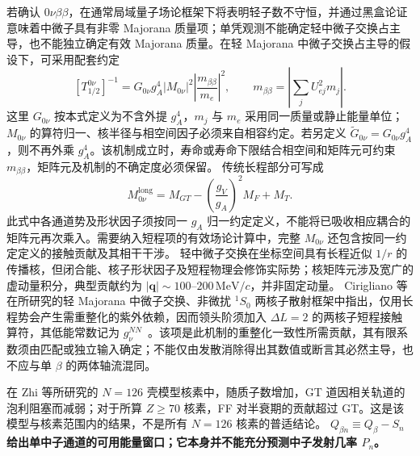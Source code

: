 若确认 $0\nu\beta\beta$，在通常局域量子场论框架下将表明轻子数不守恒，并通过黑盒论证意味着中微子具有非零 Majorana 质量项；单凭观测不能确定轻中微子交换占主导，也不能独立确定有效 Majorana 质量。在轻 Majorana 中微子交换占主导的假设下，可采用配套约定
\begin{equation}\label{eq:4-7-0nubb-halflife}
[T_{1/2}^{0\nu}]^{-1}=G_{0\nu}g_A^4|M_{0\nu}|^2\left|\frac{m_{\beta\beta}}{m_e}\right|^2,\qquad m_{\beta\beta}=\left|\sum_jU_{ej}^2m_j\right|.
\end{equation}
这里 $G_{0\nu}$ 按本式定义为不含外提 $g_A^4$，$m_j$ 与 $m_e$ 采用同一质量或静止能量单位；$M_{0\nu}$ 的算符归一、核半径与相空间因子必须来自相容约定。若另定义 $\widetilde G_{0\nu}=G_{0\nu}g_A^4$，则不再外乘 $g_A^4$。该机制成立时，寿命或寿命下限结合相空间和矩阵元可约束 $m_{\beta\beta}$，矩阵元及机制的不确定度必须保留。
传统长程部分可写成
\begin{equation}\label{eq:4-7-NME-decomposition}
M_{0\nu}^{\mathrm{long}}=M_{GT}-\left(\frac{g_V}{g_A}\right)^2M_F+M_T.
\end{equation}
此式中各通道势及形状因子须按同一 $g_A$ 归一约定定义，不能将已吸收相应耦合的矩阵元再次乘入。需要纳入短程项的有效场论计算中，完整 $M_{0\nu}$ 还包含按同一约定定义的接触贡献及其相干干涉。
轻中微子交换在坐标空间具有长程近似 $1/r$ 的传播核，但闭合能、核子形状因子及短程物理会修饰实际势；核矩阵元涉及宽广的虚动量积分，典型贡献约为 $|\mathbf q|\sim100$--$200\,\mathrm{MeV}/c$，并非固定动量。
Cirigliano 等在所研究的轻 Majorana 中微子交换、非微扰 $^1S_0$ 两核子散射框架中指出，仅用长程势会产生需重整化的紫外依赖，因而领头阶须加入 $\Delta L=2$ 的两核子短程接触算符，其低能常数记为 $g_\nu^{NN}$~\cite{cirigliano-2018-leading-short-range-double-beta}。该项是此机制的重整化一致性所需贡献，其有限系数须由匹配或独立输入确定；不能仅由发散消除得出其数值或断言其必然主导，也不应与单 $\beta$ 的两体轴流混同。

\item 在 Zhi 等所研究的 $N=126$ 壳模型核素中，随质子数增加，GT 道因相关轨道的泡利阻塞而减弱；对于所算 $Z\geq70$ 核素，FF 对半衰期的贡献超过 GT。这是该模型与核素范围内的结果，不是所有 $N=126$ 核素的普适结论。
\textbf{$Q_{\beta n}\equiv Q_\beta-S_n$ 给出单中子通道的可用能量窗口；它本身并不能充分预测中子发射几率 $P_n$。}
